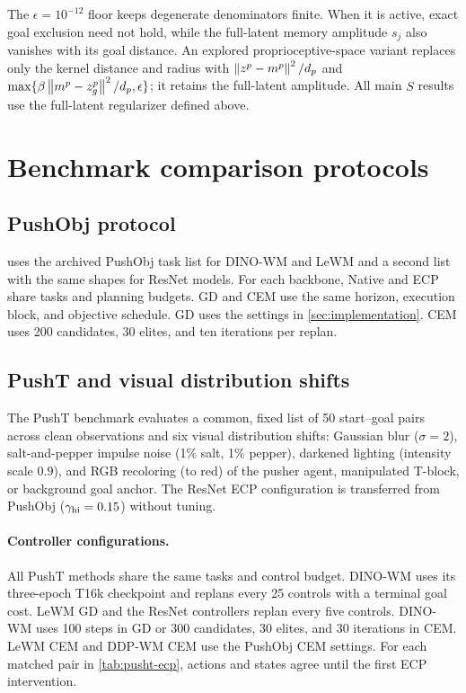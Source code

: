The $\epsilon=10^{-12}$ floor keeps degenerate denominators finite. When it is active, exact goal exclusion need not hold, while the full-latent memory amplitude $s_j$ also vanishes with its goal distance. An explored proprioceptive-space variant replaces only the kernel distance and radius with $\left\lVert z^p-m^p\right\rVert^2/d_p$ and $\max\{\beta\left\lVert m^p-z_g^p\right\rVert^2/d_p,\epsilon\}$; it retains the full-latent amplitude. All main $S$ results use the full-latent regularizer defined above.

\section{Benchmark comparison protocols}
\label{sec:benchmark}
\subsection{PushObj protocol}
\label{sec:pushobj-comparison}
 uses the archived PushObj task list for DINO-WM and LeWM and a second list with the same shapes for ResNet models. For each backbone, Native and ECP share tasks and planning budgets. GD and CEM use the same horizon, execution block, and objective schedule. GD uses the settings in \cref{sec:implementation}. CEM uses 200 candidates, 30 elites, and ten iterations per replan.

\subsection{PushT and visual distribution shifts}
\label{sec:pusht-extension}
The PushT benchmark evaluates a common, fixed list of 50 start--goal pairs across clean observations and six visual distribution shifts: Gaussian blur ($\sigma=2$), salt-and-pepper impulse noise (1\% salt, 1\% pepper), darkened lighting (intensity scale $0.9$), and RGB recoloring (to red) of the pusher agent, manipulated T-block, or background goal anchor. The ResNet ECP configuration is transferred from PushObj ($\gamma_{\rm hi}=0.15$) without tuning.

\paragraph{Controller configurations.}
All PushT methods share the same tasks and control budget. DINO-WM uses its three-epoch T16k checkpoint and replans every 25 controls with a terminal goal cost. LeWM GD and the ResNet controllers replan every five controls. DINO-WM uses 100 steps in GD or 300 candidates, 30 elites, and 30 iterations in CEM. LeWM CEM and DDP-WM CEM use the PushObj CEM settings. For each matched pair in \cref{tab:pusht-ecp}, actions and states agree until the first ECP intervention.

